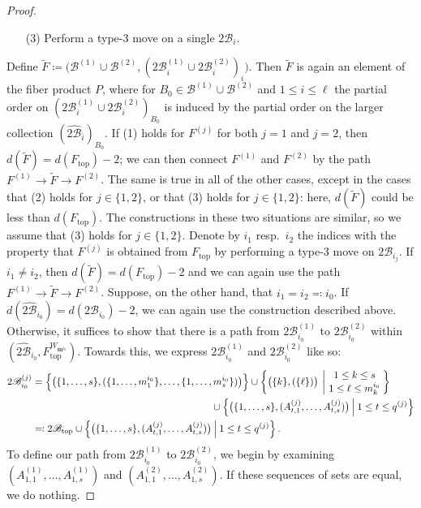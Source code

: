 \documentclass[11pt]{amsart}
\theoremstyle{definition}
\theoremstyle{remark}
\theoremstyle{plain}
\newcommand\bm{\mathbf{m}}
\newcommand{\sB}{\mathscr{B}}
\newcommand{\stB}{2\mathscr{B}}
\newcommand{\on}{\operatorname}
\renewcommand{\top}{{\on{top}}}
\newcommand{\wh}{\widehat}
\newcommand{\wt}{\widetilde}
\begin{document}
\begin{proof}
\begin{itemize}
\item[(3)] Perform a type-3 move on a single $\stB_i$.
\end{itemize}
Define $\wt F\coloneqq \bigl(\sB^{(1)}\cup\sB^{(2)},(\stB^{(1)}_i\cup\stB^{(2)}_i)_i\bigr)$.
Then $\wt F$ is again an element of the fiber product $P$, where for $B_0 \in \sB^{(1)} \cup \sB^{(2)}$ and $1 \leq i \leq \ell$ the partial order on $(\stB^{(1)}_i\cup\stB^{(2)}_i)_{B_0}$ is induced by the partial order on the larger collection $(\wh{\stB}_i)_{B_0}$.
If (1) holds for $F^{(j)}$ for both $j=1$ and $j=2$, then $d(\wt F) = d(F_\top)-2$; we can then connect $F^{(1)}$ and $F^{(2)}$ by the path $F^{(1)}\to \wt F\to F^{(2)}$.
The same is true in all of the other cases, except in the cases that (2) holds for $j \in \{1,2\}$, or that (3) holds for $j\in\{1,2\}$: here, $d(\wt F)$ could be less than $d(F_\top)$.
The constructions in these two situations are similar, so we assume that (3) holds for $j \in \{1,2\}$.
Denote by $i_1$ resp.\ $i_2$ the indices with the property that $F^{(j)}$ is obtained from $F_\top$ by performing a type-3 move on $\stB_{i_j}$.
If $i_1\neq i_2$, then $d(\wt F) = d(F_\top)-2$ and we can again use the path $F^{(1)} \to \wt F \to F^{(2)}$.
Suppose, on the other hand, that $i_1=i_2\eqqcolon i_0$.
If $d(\wh{\stB}_{i_0})=d(\stB_{i_0})-2$, we can again use the construction described above.
Otherwise, it suffices to show that there is a path from $\stB^{(1)}_{i_0}$ to $\stB^{(2)}_{i_0}$ within
$(\wh{\stB}_{i_0},F_\top^{W_{\bm^{i_0}}})$.
Towards this, we express $\stB^{(1)}_{i_0}$ and $\stB^{(2)}_{i_0}$ like so:
\begin{align}
\stB^{(j)}_{i_0} &= \Bigl\{\bigl(\{1,\ldots,s\},(\{1,\ldots,m^{i_0}_1\},\ldots,\{1,\ldots,m^{i_0}_s\})\bigr)\Bigr\}
\cup
\left\{\bigl(\{k\},(\{\ell\})\bigr) \:\left|\: {{1\leq k\leq s}\atop{1\leq \ell\leq m^{i_0}_k}}\right.\right\}
\\
&\hspace{2.5in} \cup \left\{\bigl(\{1,\ldots,s\},(A^{(j)}_{t,1},\ldots,A^{(j)}_{t,s})\bigr) \:\Big|\: 1 \leq t \leq q^{(j)}\right\}
\nonumber\\
&\eqqcolon \stB_\top \cup \left\{\bigl(\{1,\ldots,s\},(A^{(j)}_{t,1},\ldots,A^{(j)}_{t,s})\bigr) \:\Big|\: 1 \leq t \leq q^{(j)}\right\}.
\nonumber
\end{align}
To define our path from $\stB^{(1)}_{i_0}$ to $\stB^{(2)}_{i_0}$, we begin by examining $(A^{(1)}_{1,1},\ldots,A^{(1)}_{1,s})$ and $(A^{(2)}_{1,1},\ldots,A^{(2)}_{1,s})$.
If these sequences of sets are equal, we do nothing.

\end{proof}
\end{document}
